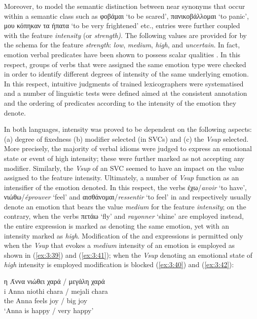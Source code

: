 \documentclass[output=paper]{langsci/langscibook}
\begin{document}
Moreover, to model the semantic distinction between near synonyms that
occur within a semantic class such as φοβάμαι ‘to
be scared’, πανικοβάλλομαι ‘to panic’,
μου κόπηκαν τα ήπατα ‘to be very frightened’ etc.,
entries were further coupled with the feature
\textit{intensity }(or\textit{ strength)}. The
following values are provided for by the schema for the feature
\textit{strength}: \textit{low}, \textit{medium},
\textit{high}, and \textit{uncertain}. In fact,
emotion verbal predicates have been shown to possess scalar qualities
\citep{fellbaum2012}. In this respect, groups of verbs
that were assigned the same emotion type were checked in order to
identify different degrees of intensity of the same underlying emotion.
In this respect, intuitive judgments of trained lexicographers were
systematised and a number of linguistic tests were defined aimed at the
consistent annotation and the ordering of predicates according to the
intensity of the emotion they denote.



In both languages, intensity was proved to be dependent on the following
aspects: (a) degree of fixedness (b) modifier selected (in SVCs) and
(c) the \textit{Vsup} selected. More precisely, the majority of verbal
idioms were judged to express an emotional state or event of high
intensity; these were further marked as not accepting any modifier.
Similarly, the \textit{Vsup} of an SVC seemed to have an impact on the
value assigned to the feature intensity. Ultimately, a number of
\textit{Vsup} function as an intensifier of the emotion denoted. In
this respect, the verbs έχω/\textit{avoir} ‘to have’,
νιώθω/\textit{éprouver} ‘feel’ and αισθάνομαι/\textit{ressentir} ‘to
feel’ in  and  respectively usually denote an emotion that bears
the value \textit{medium} for the feature \textit{intensity}; on the
contrary, when the verbs πετάω ‘fly’ and \textit{rayonner}
‘shine’ are employed instead, the entire expression is marked as
denoting the same emotion, yet with an intensity marked as
\textit{high}. Modification of the  and  expressions is permitted
only when the \textit{Vsup} that evokes a \textit{medium} intensity of an
emotion is employed as shown in (\ref{ex:3:39}) and (\ref{ex:3:41}); when the \textit{Vsup} denoting
an emotional state of \textit{high} intensity is employed modification
is blocked (\ref{ex:3:40}) and (\ref{ex:3:42}):


\begin{exe}
\ex \label{ex:3:39}
\glll η Άννα νιώθει χαρά / μεγάλη χαρά \\
 i Anna niothi chara / mejali chara\\
 the Anna feels joy / big joy\\
\glt %
‘Anna is happy / very happy’
\end{exe}
\end{document}

